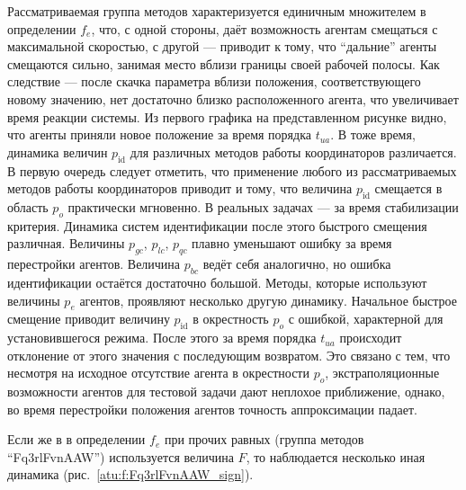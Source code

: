 Рассматриваемая группа методов характеризуется единичным множителем в определении $f_e$,
что, с одной стороны, даёт возможность агентам смещаться с максимальной скоростью,
с другой --- приводит к тому, что ``дальние'' агенты смещаются сильно, занимая место
вблизи границы своей рабочей полосы. Как следствие --- после скачка параметра
вблизи положения, соответствующего новому значению, нет достаточно близко
расположенного агента, что увеличивает время реакции системы.
Из первого графика на представленном рисунке
видно, что агенты приняли новое положение за время порядка $t_{ua}$.
В тоже время, динамика величин $p_\mathrm{id}$ для различных методов работы координаторов
различается. В первую очередь следует отметить, что применение любого из рассматриваемых
методов работы координаторов приводит и тому, что величина $p_\mathrm{id}$
смещается в область $p_o$ практически мгновенно. В реальных задачах --- за время стабилизации критерия.
Динамика систем идентификации после этого быстрого смещения различная.
Величины $p_{gc}$, $p_{lc}$, $p_{qc}$ плавно уменьшают ошибку за время
перестройки агентов. Величина $p_{bc}$ ведёт себя аналогично, но ошибка
идентификации остаётся достаточно большой. Методы, которые используют величины $p_e$
агентов, проявляют несколько другую динамику. Начальное быстрое смещение
приводит величину $p_\mathrm{id}$ в окрестность $p_o$ с ошибкой,
характерной для установившегося режима. После этого за время порядка $t_{ua}$
происходит отклонение от этого значения с последующим возвратом.
Это связано с тем, что несмотря на исходное отсутствие агента в окрестности
$p_o$, экстраполяционные возможности агентов для тестовой задачи
дают неплохое приближение, однако, во время перестройки положения агентов
точность аппроксимации падает.


Если же в в определении $f_e$ при прочих равных (группа методов ``Fq3rlFvnAAW'')
используется величина $F$,
то наблюдается несколько иная динамика
(рис.~\ref{atu:f:Fq3rlFvnAAW_sign}).

